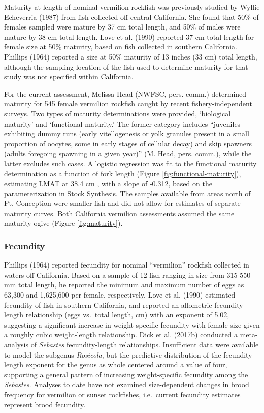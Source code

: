 \documentclass[
  english,
  a4paper,
]{article}
\begin{document}
Maturity at length of nominal vermilion rockfish was previously studied by Wyllie Echeverria (1987) from fish collected off central California. She found that 50\% of females sampled were mature by 37 cm total length, and 50\% of males were mature by 38 cm total length. Love et al. (1990) reported 37 cm total length for female size at 50\% maturity, based on fish collected in southern California. Phillips (1964) reported a size at 50\% maturity of 13 inches (33 cm) total length, although the sampling location of the fish used to determine maturity for that study was not specified within California.

For the current assessment, Melissa Head (NWFSC, pers. comm.) determined maturity
for 545 female vermilion rockfish caught by recent fishery-independent surveys. Two types
of maturity determinations were provided, `biological maturity' and `functional
maturity.' The former category includes ``juveniles exhibiting dummy runs (early
vitellogenesis or yolk granules present in a small proportion of oocytes, some
in early stages of cellular decay) and skip spawners (adults foregoing spawning
in a given year)'' (M. Head, pers. comm.), while the latter excludes such cases.
A logistic regression was fit to the functional maturity determination as a function of fork length (Figure \ref{fig:functional-maturity}), estimating LMAT at 38.4 cm , with a slope of -0.312,
based on the parameterization in Stock Synthesis. The samples available from areas north of Pt. Conception were smaller fish and did not allow for estimates of separate
maturity curves. Both California vermilion assessments assumed the same maturity
ogive (Figure \ref{fig:maturity}).

\hypertarget{fecundity}{%
\subsubsection{Fecundity}\label{fecundity}}

Phillips (1964) reported fecundity for nominal ``vermilion'' rockfish collected in waters off California. Based on a sample of 12 fish ranging in size from 315-550 mm total length, he reported the minimum and maximum number of eggs as 63,300 and 1,625,600 per female, respectively. Love et al. (1990) estimated fecundity of fish in southern California, and reported an allometric fecundity - length relationship (eggs vs.~total length, cm) with an exponent of 5.02, suggesting a significant increase in weight-specific fecundity with female size given a roughly cubic weight-length relationship. Dick et al. (2017b) conducted a meta-analysis of \emph{Sebastes} fecundity-length relationships. Insufficient data were available to model the subgenus \emph{Rosicola}, but the predictive distribution of the fecundity-length exponent for the genus as whole centered around a value of four, supporting a general pattern of increasing weight-specific fecundity among the \emph{Sebastes}. Analyses to date have not examined size-dependent changes in brood frequency for vermilion or sunset rockfishes, i.e.~current fecundity estimates represent brood fecundity.
\end{document}
